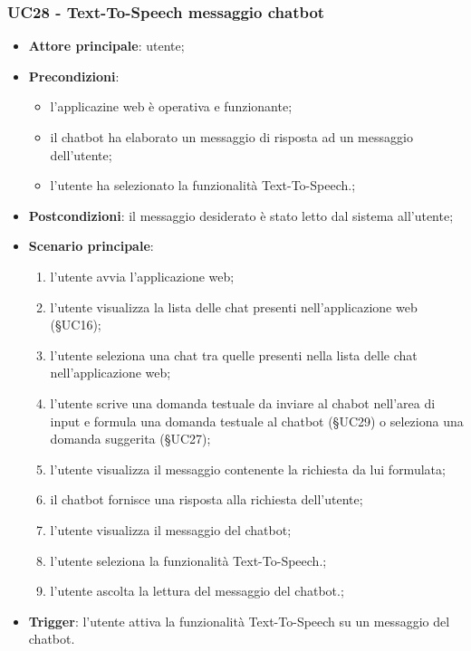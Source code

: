 \documentclass[10pt, a4paper]{article}
\begin{document}
    \subsubsection{UC28 - Text-To-Speech messaggio chatbot}
    \begin{itemize}
        \item \textbf{Attore principale}: utente;
        \item \textbf{Precondizioni}: 
        \begin{itemize}
            \item l'applicazine web è operativa e funzionante;
            \item il chatbot ha elaborato un messaggio di risposta ad un messaggio dell'utente;
            \item l'utente ha selezionato la funzionalità Text-To-Speech.;
        \end{itemize}
        \item \textbf{Postcondizioni}: il messaggio desiderato è stato letto dal sistema all'utente;
        \item \textbf{Scenario principale}:
            \begin{enumerate}
                \item l'utente avvia l'applicazione web;
                \item l'utente visualizza la lista delle chat presenti nell'applicazione web (\S UC16);
                \item l'utente seleziona una chat tra quelle presenti nella lista delle chat nell'applicazione web;
                \item l'utente scrive una domanda testuale da inviare al chabot nell'area di input e formula una domanda testuale al chatbot (\S UC29) o seleziona una domanda suggerita (\S UC27);
                \item l'utente visualizza il messaggio contenente la richiesta da lui formulata;
                \item il chatbot fornisce una risposta alla richiesta dell'utente;
                \item l'utente visualizza il messaggio del chatbot;
                \item l'utente seleziona la funzionalità Text-To-Speech.;
                \item l'utente ascolta la lettura del messaggio del chatbot.;
            \end{enumerate}
        \item \textbf{Trigger}: l'utente attiva la funzionalità Text-To-Speech su un messaggio del chatbot.
    \end{itemize}
\end{document}
